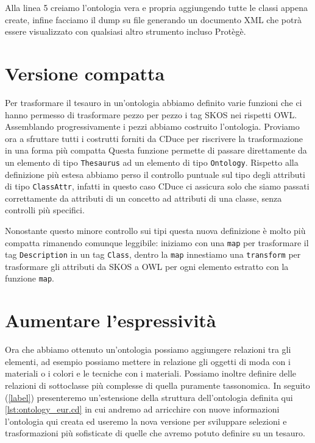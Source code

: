 Alla linea 5 creiamo l'ontologia vera e propria aggiungendo tutte le classi appena create, infine facciamo il dump su file generando un documento XML che potrà essere visualizzato con qualsiasi altro strumento incluso Protègè.
\section{Versione compatta}
Per trasformare il tesauro in un'ontologia abbiamo definito varie funzioni che ci hanno permesso di trasformare pezzo per pezzo i tag SKOS nei rispetti OWL. Assemblando progressivamente i pezzi abbiamo costruito l'ontologia. Proviamo ora a sfruttare tutti i costrutti forniti da CDuce per riscrivere la trasformazione in una forma più compatta
Questa funzione permette di passare direttamente da un elemento di tipo \verb|Thesaurus| ad un elemento di tipo \verb|Ontology|. Rispetto alla definizione più estesa abbiamo perso il controllo puntuale sul tipo degli attributi di tipo \verb|ClassAttr|, infatti in questo caso CDuce ci assicura solo che siamo passati correttamente da attributi di un concetto ad attributi di una classe, senza controlli più specifici.

Nonostante questo minore controllo sui tipi questa nuova definizione è molto più compatta rimanendo comunque leggibile: iniziamo con una \verb|map| per trasformare il tag \verb|Description| in un tag \verb|Class|, dentro la \verb|map| innestiamo una \verb|transform| per trasformare gli attributi da SKOS a OWL per ogni elemento estratto con la funzione \verb|map|.

\section{Aumentare l'espressività}\label{expr}
Ora che abbiamo ottenuto un'ontologia possiamo aggiungere relazioni tra gli elementi, ad esempio possiamo mettere in relazione gli oggetti di moda con i materiali o i colori e le tecniche con i materiali. Possiamo inoltre definire delle relazioni di sottoclasse più complesse di quella puramente tassonomica.  In seguito (\ref{label}) presenteremo un'estensione della struttura dell'ontologia definita qui \ref{lst:ontology_eur.cd} in cui andremo ad arricchire con nuove informazioni l'ontologia qui creata ed useremo la nova versione per sviluppare selezioni e trasformazioni più sofisticate di quelle che avremo potuto definire su un tesauro.

